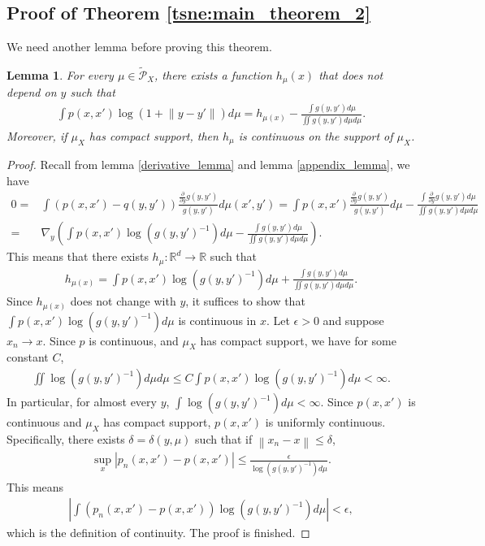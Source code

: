 \documentclass[10pt]{article}
\newcommand{\norm}[1]{\left\lVert#1\right\rVert}
\newtheorem{lemma}{\bf Lemma}
\newenvironment{Proof of lemma}{\noindent{\bf Proof of Lemma}}{\hfill$\Box$\newline}
\newenvironment{Proof of claim}{\noindent{\bf Proof of claim}}{\hfill$\Box$\newline}
\newenvironment{Proof of theorem}{\noindent{\bf Proof of Theorem}}{\hfill\scriptsize{$\Box$}\newline}
\newenvironment{Proof of theorems}{\noindent{\bf Proof of Theorems}}{\hfill$\Box$\newline}
\newenvironment{Proof of proposition}{\noindent{\bf Proof of Proposition}}{\hfill$\Box$\newline}
\newenvironment{Proof of propositions}{\noindent{\bf Proof of Propositions}}{\hfill$\Box$\newline}
\newenvironment{Proof of exercise}{\noindent{\it Proof of Exercise:}}{\hfill$\Box$}
\numberwithin{equation}{section}
\begin{document}
\subsection{Proof of Theorem \ref{tsne:main_theorem_2}}
We need another lemma before proving this theorem.
\begin{lemma} \label{home_stretch_lemma}
    For every $\mu \in \tilde{\mathcal{P}}_X$, there exists a function $h_{\mu}(x)$ that does not depend on $y$ such that
    \begin{align}
        \int p(x,x') \log(1+\norm{y-y'})d\mu = h_{\mu(x)} - \frac{\int g(y,y')d\mu}{\iint g(y,y')d\mu d\mu}.
    \end{align}
    Moreover, if $\mu_X$ has compact support, then $h_{\mu}$ is continuous on the support of $\mu_X$.
\end{lemma}
\begin{proof}
    Recall from lemma \ref{derivative_lemma} and lemma \ref{appendix_lemma}, we have
    \begin{align}
        0 = & \int (p(x,x')-q(y,y')) \frac{\frac{\partial}{\partial y}g(y,y')}{g(y,y')} d\mu(x',y') = \int p(x,x') \frac{\frac{\partial}{\partial y}g(y,y')}{g(y,y')} d \mu -  \frac{\int \frac{\partial}{\partial y}g(y,y')d\mu}{\iint g(y,y')d\mu d\mu} \nonumber \\
        =   & \nabla_y \left(\int p(x,x') \log (g(y,y')^{-1}) d \mu -  \frac{\int g(y,y')d\mu}{\iint g(y,y')d\mu d\mu}\right).
    \end{align}
    This means that there exists $h_{\mu}: \mathbb{R}^d \to \mathbb{R}$ such that
    \begin{align}
        h_{\mu(x)} = \int p(x,x') \log(g(y,y')^{-1})d\mu + \frac{\int g(y,y')d\mu}{\iint g(y,y')d\mu d\mu}.
    \end{align}
    Since $h_{\mu(x)}$ does not change with $y$, it suffices to show that $\int p(x,x') \log(g(y,y')^{-1})d\mu$ is continuous in $x$. Let $\epsilon>0$ and suppose $x_n \to x$. Since $p$ is continuous, and $\mu_X$ has compact support, we have for some constant $C$,
    \begin{align}
        \iint \log(g(y,y')^{-1})d\mu d\mu \leq C \int p(x,x') \log(g(y,y')^{-1})d\mu < \infty.
    \end{align}
    In particular, for almost every $y$, $\int \log(g(y,y')^{-1})d\mu < \infty$. Since $p(x,x')$ is continuous and $\mu_X$ has compact support, $p(x,x')$ is uniformly continuous. Specifically, there exists $\delta = \delta(y,\mu)$ such that if $\norm{x_n-x} \leq \delta$,
    \begin{align}
        \sup_x |p_n(x,x')-p(x,x')| \leq \frac{\epsilon}{\log(g(y,y')^{-1})d\mu}.
    \end{align}
    This means
    \begin{align}
        \left|\int(p_n(x,x')-p(x,x')) \log(g(y,y')^{-1})d \mu\right| < \epsilon,
    \end{align}
    which is the definition of continuity. The proof is finished.
\end{proof}
\end{document}
